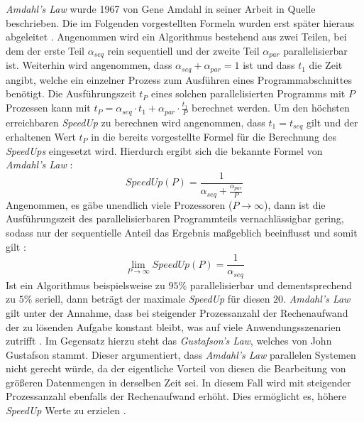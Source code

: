 \\\\
\emph{Amdahl's Law} wurde 1967 von Gene Amdahl in seiner Arbeit in Quelle \cite{amdahll1967validity} beschrieben. Die im Folgenden vorgestellten Formeln wurden erst später hieraus abgeleitet \cite{amdahll1967validity}. Angenommen wird ein Algorithmus bestehend aus zwei Teilen, bei dem der erste Teil $\alpha_{seq}$ rein sequentiell und der zweite Teil $\alpha_{par}$ parallelisierbar ist. Weiterhin wird angenommen, dass $\alpha_{seq}+\alpha_{par}=1$ ist und dass $t_1$ die Zeit angibt, welche ein einzelner Prozess zum Ausführen eines Programmabschnittes benötigt. Die Ausführungszeit $t_P$ eines solchen parallelisierten Programms mit $P$ Prozessen kann mit $t_P=\alpha_{seq} \cdot t_1 + \alpha_{par} \cdot \frac{t_1}{P}$ berechnet werden. Um den höchsten erreichbaren \emph{SpeedUp} zu berechnen wird angenommen, dass $t_1=t_{seq}$ gilt und der erhaltenen Wert $t_P$ in die bereits vorgestellte Formel für die Berechnung des \emph{SpeedUps} eingesetzt wird. Hierdurch ergibt sich die bekannte Formel von \emph{Amdahl's Law} \cite{nielsen2016introduction}: 
$$SpeedUp(P)=\frac{1}{\alpha_{seq}+\frac{\alpha_{par}}{P}}$$
Angenommen, es gäbe unendlich viele Prozessoren ($P \rightarrow \infty$), dann ist die Ausführungszeit des parallelisierbaren Programmteils vernachlässigbar gering, sodass nur der sequentielle Anteil das Ergebnis maßgeblich beeinflusst und somit gilt \cite{nielsen2016introduction}:
$$\lim _{P \rightarrow \infty} SpeedUp(P)=\frac{1}{\alpha_{seq}}$$
Ist ein Algorithmus beispielsweise zu $95\%$ parallelisierbar und dementsprechend zu $5\%$ seriell, dann beträgt der maximale \emph{SpeedUp} für diesen $20$. \emph{Amdahl's Law} gilt unter der Annahme, dass bei steigender Prozessanzahl der Rechenaufwand der zu lösenden Aufgabe konstant bleibt, was auf viele Anwendungsszenarien zutrifft \cite{nielsen2016introduction}. Im Gegensatz hierzu steht das \emph{Gustafson's Law}, welches von John Gustafson stammt. Dieser argumentiert, dass \emph{Amdahl's Law} parallelen Systemen nicht gerecht würde, da der eigentliche Vorteil von diesen die Bearbeitung von größeren Datenmengen in derselben Zeit sei. In diesem Fall wird mit steigender Prozessanzahl ebenfalls der Rechenaufwand erhöht. Dies ermöglicht es, höhere \emph{SpeedUp} Werte zu erzielen \cite{hill2008amdahl}.



















